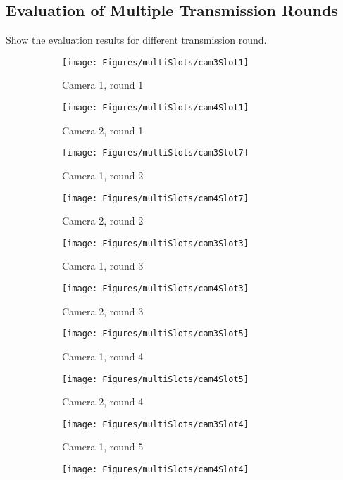 {\subsection{Evaluation of Multiple Transmission Rounds}
{\color{red}Show the evaluation results for different transmission round.}
\begin{figure}
\begin{center}
\begin{subfigure}[b]{0.4\columnwidth}
\texttt{[image: Figures/multiSlots/cam3Slot1]}
\caption{Camera 1, round 1}
\end{subfigure}
\begin{subfigure}[b]{0.4\columnwidth}
\texttt{[image: Figures/multiSlots/cam4Slot1]}
\caption{Camera 2, round 1}
\end{subfigure}
%
\begin{subfigure}[b]{0.4\columnwidth}
\texttt{[image: Figures/multiSlots/cam3Slot7]}
\caption{Camera 1, round 2}
\end{subfigure}
\begin{subfigure}[b]{0.4\columnwidth}
\texttt{[image: Figures/multiSlots/cam4Slot7]}
\caption{Camera 2, round 2}
\end{subfigure}
%
\begin{subfigure}[b]{0.4\columnwidth}
\texttt{[image: Figures/multiSlots/cam3Slot3]}
\caption{Camera 1, round 3}
\end{subfigure}
\begin{subfigure}[b]{0.4\columnwidth}
\texttt{[image: Figures/multiSlots/cam4Slot3]}
\caption{Camera 2, round 3}
\end{subfigure}
%
\begin{subfigure}[b]{0.4\columnwidth}
\texttt{[image: Figures/multiSlots/cam3Slot5]}
\caption{Camera 1, round 4}
\end{subfigure}
\begin{subfigure}[b]{0.4\columnwidth}
\texttt{[image: Figures/multiSlots/cam4Slot5]}
\caption{Camera 2, round 4}
\end{subfigure}
%
\begin{subfigure}[b]{0.4\columnwidth}
\texttt{[image: Figures/multiSlots/cam3Slot4]}
\caption{Camera 1, round 5}
\end{subfigure}
\begin{subfigure}[b]{0.4\columnwidth}
\texttt{[image: Figures/multiSlots/cam4Slot4]}

\end{subfigure}
\end{center}
\end{figure}}
